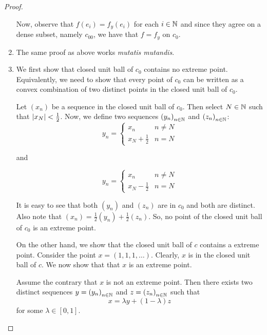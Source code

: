 \begin{proof}
\begin{enumerate}[label=(\alph*)]
     Now, observe that $f(e_{i})=f_{y}(e_{i})$ for each $i\in \mathbb N$ and since they agree on a dense subset, namely $c_{00}$, we have that $f=f_{y}$ on $c_{0}$.

 \item The same proof as above works \emph{mutatis mutandis}. 

 \item We first show that closed unit ball of $c_{0}$ contains no extreme point. Equivalently, we need to show that every point of $c_{0}$ can be written as a convex combination of two distinct points in the closed unit ball of $c_{0}$.

     Let $\left( x_{n} \right)$ be a sequence in the closed unit ball of $c_{0}$. Then select $N\in \mathbb N$ such that $\left\lvert x_{N} \right\rvert < \frac{1}{2}$. Now, we define two sequences $\left( y_{n} \right)_{n\in \mathbb N}$ and $\left( z_{n} \right)_{n\in \mathbb N}$:
     \begin{equation*}
	 y_{n} =
	 \begin{cases}
	     x_{n} & n \ne N \\
	     x_{N} + \frac{1}{2} &n =N
	 \end{cases}
     \end{equation*}

     and 

 \begin{equation*}
	 y_{n} =
	 \begin{cases}
	     x_{n} & n \ne N \\
	     x_{N} - \frac{1}{2} &n =N
	 \end{cases}
     \end{equation*}

     It is easy to see that both $\left( y_{n} \right)$ and $\left( z_{n} \right)$ are in $c_{0}$ and both are distinct. Also note that $\left( x_{n} \right) = \frac{1}{2} \left( y_{n} \right) + \frac{1}{2} \left( z_{n} \right)$. So, no point of the closed unit ball of $c_{0}$ is an extreme point.

     On the other hand, we show that the closed unit ball of $c$ contains a extreme point. Consider the point $x=\left( 1,1,1, \ldots \right)$. Clearly, $x$ is in the closed unit ball of $c$. We now show that that $x$ is an extreme point.

     Assume the contrary that $x$ is not an extreme point. Then there exists two distinct sequences $y=\left( y_{n} \right)_{n\in \mathbb N}$ and $z=\left( z_{n} \right)_{n\in\mathbb N}$ such that 
     \begin{equation*}
	 x=\lambda y + \left( 1-\lambda \right)z
     \end{equation*}
     for some $\lambda \in [0,1]$.


\end{enumerate}
\end{proof}
